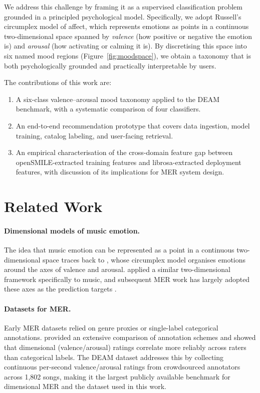 \documentclass{article}
\begin{document}
We address this challenge by framing it as a supervised classification problem
grounded in a principled psychological model.
Specifically, we adopt Russell's \citeyearpar{russell1980circumplex}
circumplex model of affect, which represents emotions as points in a continuous
two-dimensional space spanned by \emph{valence} (how positive or negative the
emotion is) and \emph{arousal} (how activating or calming it is).
By discretising this space into six named mood regions (Figure~\ref{fig:moodspace}),
we obtain a taxonomy that is both psychologically grounded and practically
interpretable by users.

The contributions of this work are:
\begin{enumerate}
    \item A six-class valence--arousal mood taxonomy applied to the DEAM
          benchmark, with a systematic comparison of four classifiers.
    \item An end-to-end recommendation prototype that covers data ingestion,
          model training, catalog labeling, and user-facing retrieval.
    \item An empirical characterisation of the cross-domain feature gap between
          openSMILE-extracted training features and librosa-extracted deployment
          features, with discussion of its implications for MER system design.
\end{enumerate}

%
\section{Related Work}
%

\paragraph{Dimensional models of music emotion.}
The idea that music emotion can be represented as a point in a continuous
two-dimensional space traces back to \citet{russell1980circumplex}, whose
circumplex model organises emotions around the axes of valence and arousal.
\citet{thayer1989biopsychology} applied a similar two-dimensional framework
specifically to music, and subsequent MER work has largely adopted these axes
as the prediction targets \citep{yang2012machine}.

\paragraph{Datasets for MER.}
Early MER datasets relied on genre proxies or single-label categorical
annotations.
\citet{eerola2011comparison} provided an extensive comparison of annotation
schemes and showed that dimensional (valence/arousal) ratings correlate more
reliably across raters than categorical labels.
The DEAM dataset \citep{aljanaki2017developing} addresses this by collecting
continuous per-second valence/arousal ratings from crowdsourced annotators
across 1{,}802 songs, making it the largest publicly available benchmark for
dimensional MER and the dataset used in this work.
\end{document}
